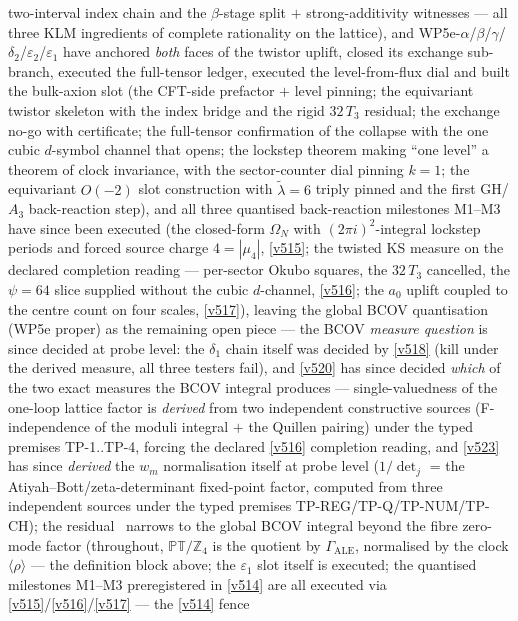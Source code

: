 \documentclass[11pt,a4paper]{article}
\newcommand{\Z}{\mathbb Z}
\begin{document}
\begin{itemize}
two-interval index chain and the $\beta$-stage split $+$ strong-additivity witnesses --- all three KLM
ingredients of complete rationality on the lattice), and WP5e-$\alpha$/$\beta$/$\gamma$/$\delta_2$/$\varepsilon_2$/$\varepsilon_1$ have anchored \emph{both}
faces of the twistor uplift, closed its exchange sub-branch, executed the full-tensor ledger,
executed the level-from-flux dial and built the bulk-axion slot
(the CFT-side prefactor $+$ level pinning; the equivariant twistor skeleton with the index bridge
and the rigid $32\,T_3$ residual; the exchange no-go with certificate; the full-tensor confirmation
of the collapse with the one cubic $d$-symbol channel that opens; the lockstep theorem making
``one level'' a theorem of clock invariance, with the sector-counter dial pinning $k=1$; the
equivariant $O(-2)$ slot construction with $\tilde\lambda=6$ triply pinned and the first GH/$A_3$
back-reaction step), and all three quantised back-reaction milestones M1--M3 have since been executed
(the closed-form $\Omega_N$ with $(2\pi i)^2$-integral lockstep periods and forced source charge
$4=|\mu_4|$, \vref{v515}; the twisted KS measure on the declared completion reading ---
per-sector Okubo squares, the $32\,T_3$ cancelled, the $\psi=64$ slice supplied without the
cubic $d$-channel, \vref{v516}; the $a_0$ uplift coupled to the centre count on four scales,
\vref{v517}),
leaving the global BCOV quantisation (WP5e proper) as the remaining open piece --- the BCOV
\emph{measure question} is since decided at probe level: the $\delta_1$ chain itself was decided
by \vref{v518} (kill under the derived measure, all three testers fail), and \vref{v520} has since
decided \emph{which} of the two exact measures the BCOV integral produces --- single-valuedness of
the one-loop lattice factor is \emph{derived} from two independent constructive sources
(F-independence of the moduli integral $+$ the Quillen pairing) under the typed premises
TP-1..TP-4, forcing the declared \vref{v516} completion reading, and \vref{v523} has since
\emph{derived} the $w_m$ normalisation itself at probe level ($1/\det_j$ = the
Atiyah--Bott/zeta-determinant fixed-point factor, computed from three independent sources
under the typed premises TP-REG/TP-Q/TP-NUM/TP-CH); the residual \mO\ narrows to the global
BCOV integral beyond the fibre zero-mode factor (throughout,
$\mathbb{PT}/\Z_4$ is the quotient by $\Gamma_{\mathrm{ALE}}$, normalised by the clock
$\langle\rho\rangle$ --- the definition block above; the
$\varepsilon_1$ slot itself is executed; the quantised milestones M1--M3 preregistered in
\vref{v514} are all executed via \vref{v515}/\vref{v516}/\vref{v517} --- the \vref{v514} fence

\end{itemize}
\end{document}
